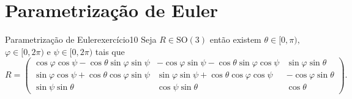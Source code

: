\section{Parametrização de Euler}
\begin{proposition}{Parametrização de Euler}{exercício10}
    Seja \(R \in \mathrm{SO}(3)\) então existem \(\theta \in [0,\pi),\) \(\varphi \in [0,2\pi)\) e \(\psi \in [0,2\pi)\) tais que
    \begin{equation*}
        R = \begin{pmatrix}
            \cos\varphi \cos\psi - \cos\theta\sin\varphi\sin\psi & - \cos\varphi\sin\psi - \cos\theta \sin\varphi\cos\psi & \sin\varphi \sin\theta\\
            \sin\varphi \cos\psi + \cos\theta \cos\varphi \sin\psi & \sin\varphi\sin\psi + \cos\theta \cos\varphi \cos\psi & - \cos\varphi \sin\theta\\
            \sin\psi \sin\theta & \cos\psi\sin\theta & \cos\theta
        \end{pmatrix}.
    \end{equation*}
\end{proposition}
